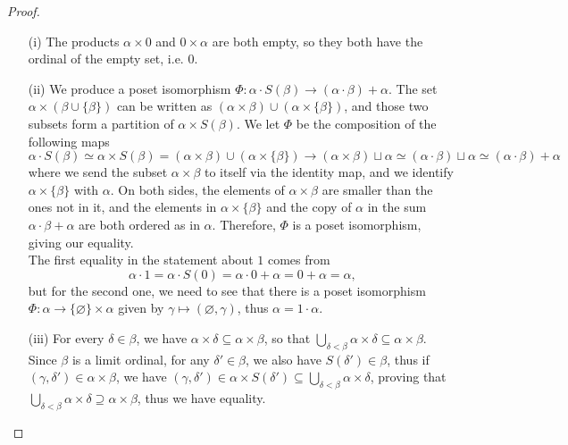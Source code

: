\begin{proof}
    \begin{itemize}
        \item[(i)] The products $\alpha \times 0$ and $0 \times \alpha$ are both empty, so they both have the ordinal of the empty set, i.e. $0$.
        \\

        \item[(ii)] We produce a poset isomorphism $\Phi : \alpha \cdot S(\beta) \to (\alpha \cdot \beta) + \alpha$. The set $\alpha \times (\beta \cup \{\beta\})$ can be written as $(\alpha \times \beta) \cup (\alpha \times \{ \beta \})$, and those two subsets form a partition of $\alpha \times S(\beta)$. We let $\Phi$ be the composition of the following maps
        \[
            \alpha \cdot S(\beta) \simeq \alpha \times S(\beta) = (\alpha \times \beta) \cup (\alpha \times \{\beta\}) \to (\alpha \times \beta) \sqcup \alpha \simeq (\alpha \cdot \beta) \sqcup \alpha \simeq (\alpha \cdot \beta) + \alpha
        \]
        where we send the subset $\alpha \times \beta$ to itself via the identity map, and we identify $\alpha \times \{\beta\}$ with $\alpha$. On both sides, the elements of $\alpha \times \beta$ are smaller than the ones not in it, and the elements in $\alpha \times \{\beta\}$ and the copy of $\alpha$ in the sum $\alpha \cdot \beta + \alpha$ are both ordered as in $\alpha$. Therefore, $\Phi$ is a poset isomorphism, giving our equality. 
        \\
        
        The first equality in the statement about $1$ comes from 
        \[
            \alpha \cdot 1 = \alpha \cdot S(0) = \alpha \cdot 0 + \alpha = 0 + \alpha = \alpha,
        \]
        but for the second one, we need to see that there is a poset isomorphism $\Phi : \alpha \to \{\varnothing\} \times \alpha$ given by $\gamma \mapsto (\varnothing, \gamma)$, thus $\alpha = 1 \cdot \alpha$.
        \\

        \item[(iii)] For every $\delta \in \beta$, we have $\alpha \times \delta \subseteq \alpha \times \beta$, so that $\bigcup_{\delta < \beta} \alpha \times \delta \subseteq \alpha \times \beta$. Since $\beta$ is a limit ordinal, for any $\delta' \in \beta$, we also have $S(\delta') \in \beta$, thus if $(\gamma,\delta') \in \alpha \times \beta$, we have $(\gamma,\delta') \in \alpha \times S(\delta') \subseteq \bigcup_{\delta < \beta} \alpha \times \delta$, proving that $\bigcup_{\delta < \beta} \alpha \times \delta \supseteq \alpha \times \beta$, thus we have equality.
        \\


\end{itemize}
\end{proof}
